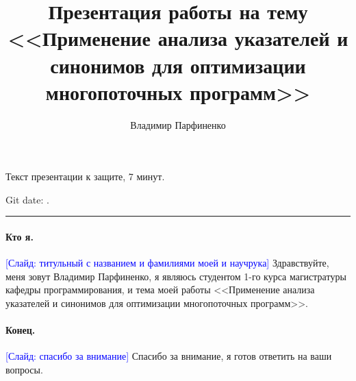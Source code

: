 \documentclass[12pt,draft]{article}
\title{
  Презентация работы на тему <<Применение анализа указателей и синонимов
  для оптимизации многопоточных программ>>
}
\author{
  Владимир Парфиненко
}
\newcommand{\slide}[1]{\textcolor{Blue}{[Слайд: #1]}}
\begin{document}
  {\Large Текст презентации к защите, 7 минут.}

  Git date: \GitDate.
  \medskip\hrule

  \paragraph{Кто я.}
  \slide{титульный с названием и фамилиями моей и научрука}
  Здравствуйте, меня зовут Владимир Парфиненко, я являюсь студентом 1-го
  курса магистратуры кафедры программирования, и тема моей работы
  <<Применение анализа указателей и синонимов для оптимизации многопоточных
  программ>>.

  \paragraph{Конец.}
  \slide{спасибо за внимание}
  Спасибо за внимание, я готов ответить на ваши вопросы.
\end{document}
